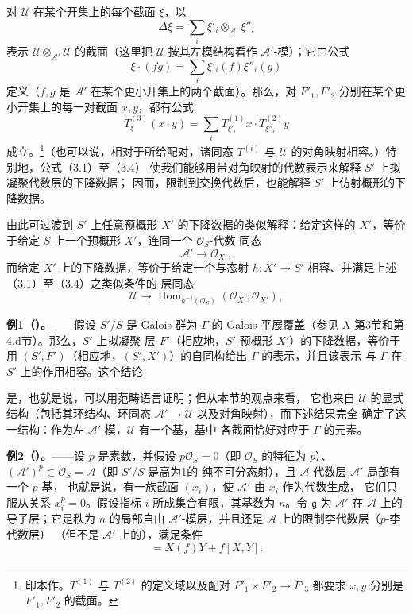 对 $\mathcal U$ 在某个开集上的每个截面 $\xi$，以
\[
  \Delta\xi=\sum_i\xi'_i\otimes_{\mathcal A'}\xi''_i
\]
表示 $\mathcal U\otimes_{\mathcal A'}\mathcal U$ 的截面（这里把
$\mathcal U$ 按其左模结构看作 $\mathcal A'$-模）；它由公式
\[
  \xi\mathbin{\cdot}(fg)=\sum_i\xi'_i(f)\xi''_i(g)
\]
定义（$f,g$ 是 $\mathcal A'$ 在某个更小开集上的两个截面）。那么，对
$F'_1,F'_2$ 分别在某个更小开集上的每一对截面 $x,y$，都有公式
\begin{equation}
  T^{(3)}_\xi(x\mathbin{\cdot}y)
  =\sum_iT^{(1)}_{\xi'_i}x\mathbin{\cdot}T^{(2)}_{\xi''_i}y
  \tag{3.4}
\end{equation}
成立。\footnote{印本作。$T^{(1)}$ 与
$T^{(2)}$ 的定义域以及配对 $F'_1\times F'_2\longrightarrow F'_3$ 都要求
$x,y$ 分别是 $F'_1,F'_2$ 的截面。}（也可以说，相对于所给配对，诸同态
$T^{(i)}$ 与 $\mathcal U$ 的对角映射相容。）特别地，公式（3.1）至（3.4）
使我们能够用带对角映射的代数表示来解释 $S'$ 上拟凝聚代数层的下降数据；
因而，限制到交换代数后，也能解释 $S'$ 上仿射概形的下降数据。

由此可过渡到 $S'$ 上任意预概形 $X'$ 的下降数据的类似解释：给定这样的
$X'$，等价于给定 $S$ 上一个预概形 $X'$，连同一个 $\mathcal O_S$-代数
同态
\[
  \mathcal A'\longrightarrow\mathcal O_{X'},
\]
而给定 $X'$ 上的下降数据，等价于给定一个与态射
$h:X'\longrightarrow S'$ 相容、并满足上述（3.1）至（3.4）之类似条件的
层同态
\[
  \mathcal U\longrightarrow
  \operatorname{Hom}_{h^{-1}(\mathcal O_S)}
  (\mathcal O_{X'},\mathcal O_{X'}),
\]

\textbf{例1（）。}——假设 $S'/S$ 是 Galois 群为
$\Gamma$ 的 Galois 平展覆盖（参见 A 第3节和第4.d节）。那么，$S'$ 上拟凝聚
层 $F'$（相应地，$S'$-预概形 $X'$）的下降数据，等价于用
$(S',F')$（相应地，$(S',X')$）的自同构给出 $\Gamma$ 的表示，并且该表示
与 $\Gamma$ 在 $S'$ 上的作用相容。这个结论

是，也就是说，可以用范畴语言证明；但从本节的观点来看，
它也来自 $\mathcal U$ 的显式结构（包括其环结构、环同态
$\mathcal A'\longrightarrow\mathcal U$ 以及对角映射），而下述结果完全
确定了这一结构：作为左 $\mathcal A'$-模，$\mathcal U$ 有一个基，基中
各截面恰好对应于 $\Gamma$ 的元素。

\textbf{例2（）。}——设 $p$ 是素数，并假设
$p\mathcal O_S=0$（即 $\mathcal O_S$ 的特征为 $p$）、
$(\mathcal A')^p\subset\mathcal O_S=\mathcal A$（即 $S'/S$ 是高为1的
纯不可分态射），且 $\mathcal A$-代数层 $\mathcal A'$ 局部有一个 $p$-基，
也就是说，有一族截面 $(x_i)$，使 $\mathcal A'$ 由 $x_i$ 作为代数生成，
它们只服从关系 $x_i^p=0$。假设指标 $i$ 所成集合有限，其基数为 $n$。令
$\mathfrak g$ 为 $\mathcal A'$ 在 $\mathcal A$ 上的导子层；它是秩为 $n$
的局部自由 $\mathcal A'$-模层，并且还是 $\mathcal A$ 上的限制李代数层（$p$-李代数层）
（但不是 $\mathcal A'$ 上的），满足条件
\begin{equation}
  [X,fY]=X(f)Y+f[X,Y].
  \tag{3.5}
\end{equation}

